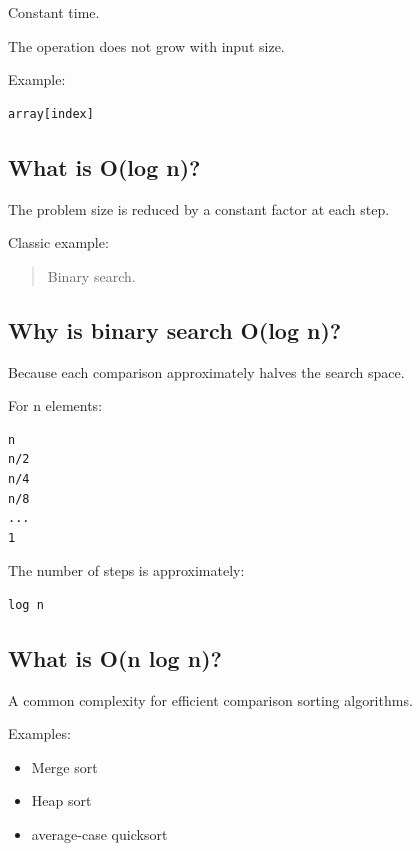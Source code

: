 Constant time.

The operation does not grow with input size.

Example:

\begin{lstlisting}
array[index]
\end{lstlisting}

\medskip

\subsection{What is O(log n)?}

The problem size is reduced by a constant factor at each step.

Classic example:

\begin{quote}
Binary search.\\
\end{quote}

\medskip

\subsection{Why is binary search O(log n)?}

Because each comparison approximately halves the search space.

For n elements:

\begin{lstlisting}
n
n/2
n/4
n/8
...
1
\end{lstlisting}

The number of steps is approximately:

\begin{lstlisting}
log n
\end{lstlisting}

\medskip

\subsection{What is O(n log n)?}

A common complexity for efficient comparison sorting algorithms.

Examples:

\begin{itemize}
  \item Merge sort
  \item Heap sort
  \item average-case quicksort
\end{itemize}

